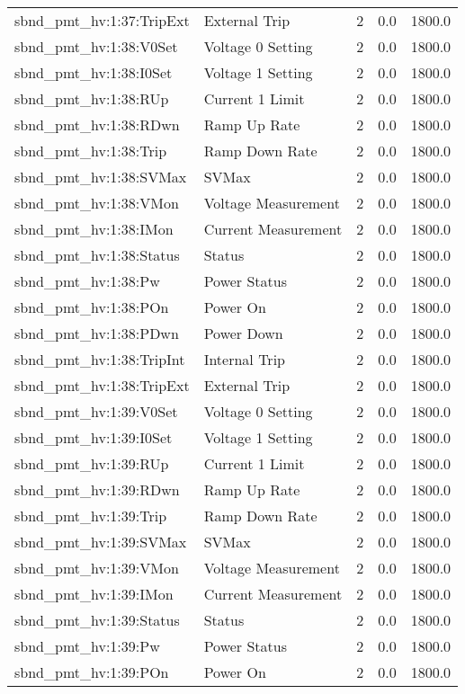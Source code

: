 \begin{center}
\begin{longtable}{l | l l l l }
sbnd\_pmt\_hv:1:37:TripExt & External Trip & 2 & 0.0 & 1800.0\\ 
sbnd\_pmt\_hv:1:38:V0Set & Voltage 0 Setting & 2 & 0.0 & 1800.0\\ 
sbnd\_pmt\_hv:1:38:I0Set & Voltage 1 Setting & 2 & 0.0 & 1800.0\\ 
sbnd\_pmt\_hv:1:38:RUp & Current 1 Limit & 2 & 0.0 & 1800.0\\ 
sbnd\_pmt\_hv:1:38:RDwn & Ramp Up Rate & 2 & 0.0 & 1800.0\\ 
sbnd\_pmt\_hv:1:38:Trip & Ramp Down Rate & 2 & 0.0 & 1800.0\\ 
sbnd\_pmt\_hv:1:38:SVMax & SVMax & 2 & 0.0 & 1800.0\\ 
sbnd\_pmt\_hv:1:38:VMon & Voltage Measurement & 2 & 0.0 & 1800.0\\ 
sbnd\_pmt\_hv:1:38:IMon & Current Measurement & 2 & 0.0 & 1800.0\\ 
sbnd\_pmt\_hv:1:38:Status & Status & 2 & 0.0 & 1800.0\\ 
sbnd\_pmt\_hv:1:38:Pw & Power Status & 2 & 0.0 & 1800.0\\ 
sbnd\_pmt\_hv:1:38:POn & Power On & 2 & 0.0 & 1800.0\\ 
sbnd\_pmt\_hv:1:38:PDwn & Power Down & 2 & 0.0 & 1800.0\\ 
sbnd\_pmt\_hv:1:38:TripInt & Internal Trip & 2 & 0.0 & 1800.0\\ 
sbnd\_pmt\_hv:1:38:TripExt & External Trip & 2 & 0.0 & 1800.0\\ 
sbnd\_pmt\_hv:1:39:V0Set & Voltage 0 Setting & 2 & 0.0 & 1800.0\\ 
sbnd\_pmt\_hv:1:39:I0Set & Voltage 1 Setting & 2 & 0.0 & 1800.0\\ 
sbnd\_pmt\_hv:1:39:RUp & Current 1 Limit & 2 & 0.0 & 1800.0\\ 
sbnd\_pmt\_hv:1:39:RDwn & Ramp Up Rate & 2 & 0.0 & 1800.0\\ 
sbnd\_pmt\_hv:1:39:Trip & Ramp Down Rate & 2 & 0.0 & 1800.0\\ 
sbnd\_pmt\_hv:1:39:SVMax & SVMax & 2 & 0.0 & 1800.0\\ 
sbnd\_pmt\_hv:1:39:VMon & Voltage Measurement & 2 & 0.0 & 1800.0\\ 
sbnd\_pmt\_hv:1:39:IMon & Current Measurement & 2 & 0.0 & 1800.0\\ 
sbnd\_pmt\_hv:1:39:Status & Status & 2 & 0.0 & 1800.0\\ 
sbnd\_pmt\_hv:1:39:Pw & Power Status & 2 & 0.0 & 1800.0\\ 
sbnd\_pmt\_hv:1:39:POn & Power On & 2 & 0.0 & 1800.0\\ 

\end{longtable}
\end{center}
